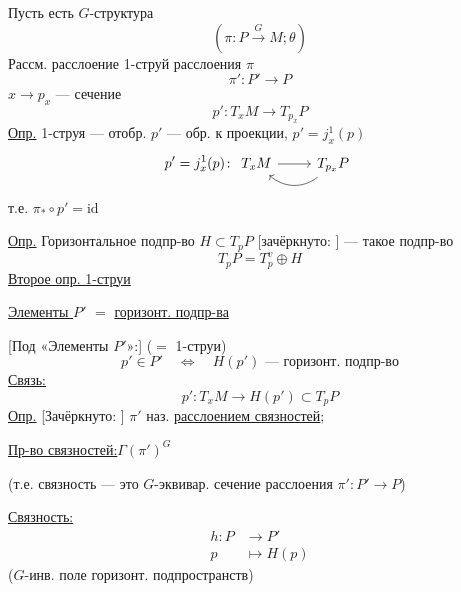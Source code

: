 Пусть есть $G$-структура
\begin{equation*}
(\pi\colon P\overset{G}{\longrightarrow}M;\theta)
\end{equation*}
Рассм. расслоение 1-струй расслоения $\pi$
\begin{equation*}
\pi'\colon P'\to P
\end{equation*}
$x\to p_x$ — сечение
\begin{equation*}
p'\colon T_xM\to T_{p_x}P
\end{equation*}
\underline{Опр.} 1-струя — отобр. $p'$ — обр. к проекции, $p'=j_x^1(p)$
\begin{equation*}
p'=j_x^1(p)\colon
\begin{tikzcd}
T_xM \arrow[r] & T_{p_x}P \arrow[l,bend left=40]
\end{tikzcd}
\end{equation*}
т.е. $\pi_*\circ p'=\mathrm{id}$

\underline{Опр.} Горизонтальное подпр-во $H\subset T_pP$
[зачёркнуто: ]
— такое подпр-во
\begin{equation*}
T_pP=T_p^v\oplus H
\end{equation*}
\underline{Второе опр. 1-струи}

\underline{Элементы $P'$} $=$ \underline{горизонт. подпр-ва}

[Под «Элементы $P'$»:] ($=$ 1-струи)
\begin{equation*}
p'\in P'\quad\Longleftrightarrow\quad H(p')\text{ — горизонт. подпр-во}
\end{equation*}
\underline{Связь:}
\begin{equation*}
p'\colon T_xM\to H(p')\subset T_pP
\end{equation*}
\underline{Опр.} [Зачёркнуто: ]
$\pi'$ наз. \underline{расслоением связностей};


\underline{Пр-во связностей:}\quad $\Gamma(\pi')^G$

(т.е. связность — это $G$-эквивар. сечение расслоения $\pi'\colon P'\to P$)

\underline{Связность:}
\begin{equation*}
\begin{aligned}
h\colon P&\to P'\\
p&\mapsto H(p)
\end{aligned}
\end{equation*}
($G$-инв. поле горизонт. подпространств)

